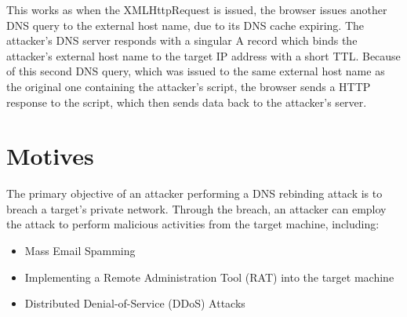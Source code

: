 \vspace{0.5cm}

This works as when the XMLHttpRequest is issued, the browser issues another DNS
query to the external host name, due to its DNS cache expiring. The attacker's
DNS server responds with a singular A record which binds the attacker's external
host name to the target IP address with a short TTL. Because of this second
DNS query, which was issued to the same external host name as the original one
containing the attacker's script, the browser sends a HTTP response to the script,
which then sends data back to the attacker's server.

\section{Motives}

The primary objective of an attacker performing a DNS rebinding attack is to
breach a target's private network. Through the breach, an attacker can employ
the attack to perform malicious activities from the target machine, including:
\begin{itemize}
	\item{Mass Email Spamming}
	\item{Implementing a Remote Administration Tool (RAT) into the target machine}
	\item{Distributed Denial-of-Service (DDoS) Attacks}
\end{itemize}
